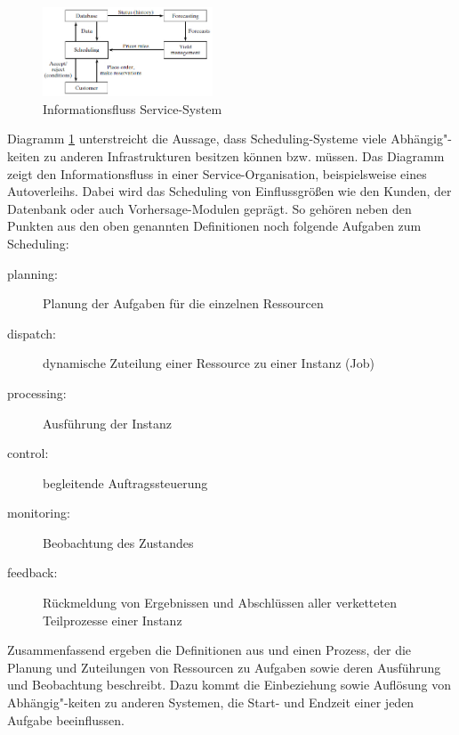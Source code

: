 \begin{figure}[h]
	\centering
	\includegraphics[width=0.45\textwidth]{pictures/info_flow_service_system}
	\caption{Informationsfluss Service-System }
	\label{f:info_flow}
\end{figure}

Diagramm \ref{f:info_flow} unterstreicht die Aussage, dass Scheduling-Systeme viele Abhängig"-keiten zu anderen Infrastrukturen besitzen können bzw. müssen. Das Diagramm zeigt den Informationsfluss in einer Service-Organisation, beispielsweise eines Autoverleihs. Dabei wird das Scheduling von Einflussgrößen wie den Kunden, der Datenbank oder auch Vorhersage-Modulen geprägt. So gehören neben den Punkten aus den oben genannten Definitionen noch folgende Aufgaben zum Scheduling:
\begin{description}
\item[planning:] Planung der Aufgaben für die einzelnen Ressourcen
\item[dispatch:] dynamische Zuteilung einer Ressource zu einer Instanz (Job)
\item[processing:] Ausführung der Instanz
\item[control:] begleitende Auftragssteuerung
\item[monitoring:] Beobachtung des Zustandes
\item[feedback:] Rückmeldung von Ergebnissen und Abschlüssen aller verketteten Teilprozesse einer Instanz
\end{description}



Zusammenfassend ergeben die Definitionen aus \cite{mpinedo} und \cite{aagnetis} einen Prozess, der die Planung und Zuteilungen von Ressourcen zu Aufgaben sowie deren Ausführung und Beobachtung beschreibt. Dazu kommt die Einbeziehung sowie Auflösung von Abhängig"-keiten zu anderen Systemen, die Start- und Endzeit einer jeden Aufgabe beeinflussen.


	